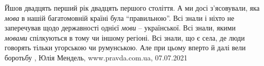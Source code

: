 Йшов двадцять перший рік двадцять першого століття. А ми досі з’ясовували, яка
\emph{мова} в нашій багатомовній країні була \enquote{правильною}. Всі знали і
ніхто не заперечував щодо державності однієї \emph{мови} – української.
Всі знали, якими \emph{мовами} спілкуються в тому чи іншому регіоні. Всі знали,
що є села, де люди говорять тільки угорською чи румунською. Але при цьому
вперто й далі вели боротьбу
, 
Юлія Мендель, www.pravda.com.ua, 07.07.2021

